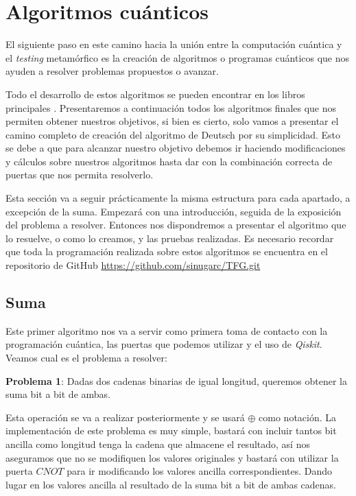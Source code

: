 \cleardoublepage

\chapter{Algoritmos cuánticos}
\label{Cap3:Algoritmos}

El siguiente paso en este camino hacia la unión entre la computación cuántica y el \textit{testing} metamórfico es la creación de algoritmos o programas cuánticos que nos ayuden a resolver problemas propuestos o avanzar. \newline

Todo el desarrollo de estos algoritmos se pueden encontrar en los libros principales \cite{B:Nielsen:2002}\cite{B:QuantumScientist:2008}. Presentaremos a continuación todos los algoritmos finales que nos permiten obtener nuestros objetivos, si bien es cierto, solo vamos a presentar el camino completo de creación del algoritmo de Deutsch por su simplicidad. Esto se debe a que para alcanzar nuestro objetivo debemos ir haciendo modificaciones y cálculos sobre nuestros algoritmos hasta dar con la combinación correcta de puertas que nos permita resolverlo.\newline

Esta sección va a seguir prácticamente la misma estructura para cada apartado, a excepción de la suma. Empezará con una introducción, seguida de la exposición del problema a resolver. Entonces nos dispondremos a presentar el algoritmo que lo resuelve, o como lo creamos, y las pruebas realizadas. Es necesario recordar que toda la programación realizada sobre estos algoritmos se encuentra en el repositorio de GitHub \url{https://github.com/sinugarc/TFG.git}

\section{Suma}
\label{Sec3.1:Suma}
 Este primer algoritmo nos va a servir como primera toma de contacto con la programación cuántica, las puertas que podemos utilizar y el uso de \textit{Qiskit}. Veamos cual es el problema a resolver:\newline

 \textbf{Problema 1}: Dadas dos cadenas binarias de igual longitud, queremos obtener la suma bit a bit de ambas.\newline

 Esta operación se va a realizar posteriormente y se usará $\oplus$ como notación. La implementación de este problema es muy simple, bastará con incluir tantos bit ancilla como longitud tenga la cadena que almacene el resultado, así nos aseguramos que no se modifiquen los valores originales y bastará con utilizar la puerta $CNOT$ para ir modificando los valores ancilla correspondientes. Dando lugar en los valores ancilla al resultado de la suma bit a bit de ambas cadenas.\newline

